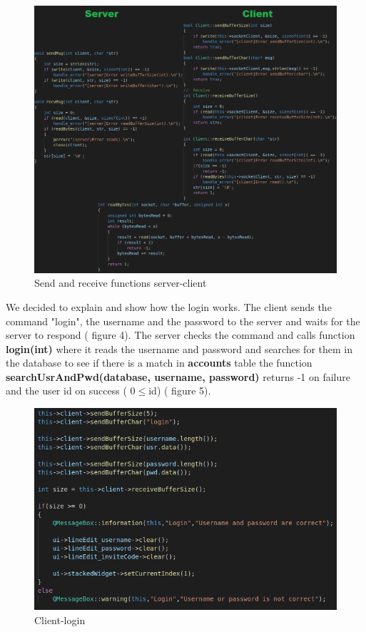 \documentclass[runningheads]{llncs}
\begin{document}
\begin{figure}[H]
\includegraphics[width=\textwidth,height=\textheight,keepaspectratio]{images/sendRecv.png}
\caption{Send and receive functions server-client}
\end{figure}

\newpage 
\par We decided to explain and show how the login works. The client sends the command "login", the username and the password to the server and waits for the server to respond ( figure 4). The server checks the command and calls function \textbf{login(int)} where it reads the username and password and searches for them in the database to see if there is a match in \textbf{accounts} table the function \textbf{searchUsrAndPwd(database, username, password)} returns -1 on failure and the user id on success ( 0$\leq$id) ( figure 5).

\begin{figure}[H]
\includegraphics[]{images/client-login.png}
\caption{Client-login}
\end{figure}
\end{document}
